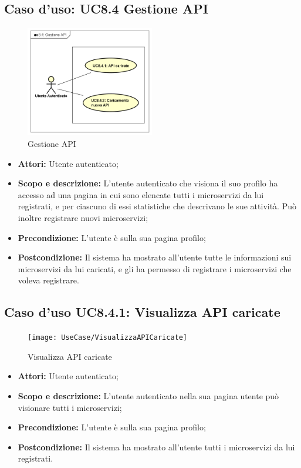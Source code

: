 \documentclass[12pt,a4paper,titlepage]{article}
\begin{document}
\subsection{Caso d'uso: UC8.4 Gestione API}
\begin{figure}[H]
	\centering
	\includegraphics[width=0.5\textwidth]{UseCase/GestioneAPI}
	\caption{Gestione API}
\end{figure}
\begin{itemize}
	\item \textbf{Attori: }Utente autenticato;
	\item \textbf{Scopo e descrizione: }L'utente autenticato che visiona il suo profilo ha accesso ad una pagina in cui sono elencate tutti i microservizi da lui registrati, e per ciascuno di essi statistiche che descrivano le sue attività. Può inoltre registrare nuovi microservizi;
	\item \textbf{Precondizione: }L'utente è sulla sua pagina profilo;
	\item \textbf{Postcondizione: }Il sistema ha mostrato all'utente tutte le informazioni sui microservizi da lui caricati, e gli ha permesso di registrare i microservizi che voleva registrare.
\end{itemize}
\subsection{Caso d'uso UC8.4.1: Visualizza API caricate}
\begin{figure}[H]
	\centering
	\texttt{[image: UseCase/VisualizzaAPICaricate]}
	\caption{Visualizza API caricate}
\end{figure}
\begin{itemize}
	\item \textbf{Attori: }Utente autenticato;
	\item \textbf{Scopo e descrizione: }L'utente autenticato nella sua pagina utente può visionare tutti i microservizi;
	\item \textbf{Precondizione: }L'utente è sulla sua pagina profilo;
	\item \textbf{Postcondizione: }Il sistema ha mostrato all'utente tutti i microservizi da lui registrati.
\end{itemize}
\end{document}
